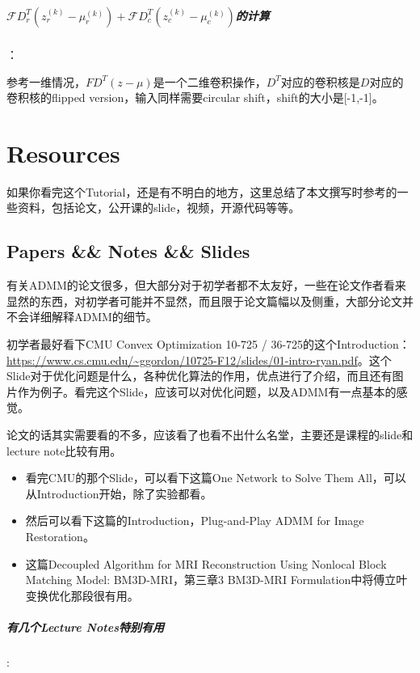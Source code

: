 \documentclass[10pt]{report}
\begin{document}
\paragraph{$\mathcal{F}D_r^T\left( z_r ^{(k)}- \mu_r ^{(k)}\right) + \mathcal{F}D_c^T\left( z_c ^{(k)}- \mu_c ^{(k)}\right)$的计算}：

参考一维情况，$FD^T(z-\mu)$是一个二维卷积操作，$D^T$对应的卷积核是$D$对应的卷积核的flipped version，输入同样需要circular shift，shift的大小是[-1,-1]。

\chapter{Resources}

如果你看完这个Tutorial，还是有不明白的地方，这里总结了本文撰写时参考的一些资料，包括论文，公开课的slide，视频，开源代码等等。

\section{Papers \&\& Notes \&\& Slides}

有关ADMM的论文很多，但大部分对于初学者都不太友好，一些在论文作者看来显然的东西，对初学者可能并不显然，而且限于论文篇幅以及侧重，大部分论文并不会详细解释ADMM的细节。

初学者最好看下CMU Convex Optimization 10-725 / 36-725的这个Introduction：\url{https://www.cs.cmu.edu/~ggordon/10725-F12/slides/01-intro-ryan.pdf}。这个Slide对于优化问题是什么，各种优化算法的作用，优点进行了介绍，而且还有图片作为例子。看完这个Slide，应该可以对优化问题，以及ADMM有一点基本的感觉。

论文的话其实需要看的不多，应该看了也看不出什么名堂，主要还是课程的slide和lecture note比较有用。

\begin{itemize}
	\item 看完CMU的那个Slide，可以看下这篇One Network to Solve Them All\cite{chang2017network}，可以从Introduction开始，除了实验都看。
	\item 然后可以看下这篇的Introduction，Plug-and-Play ADMM for Image Restoration\cite{chan2016plugandplay}。
	\item 这篇Decoupled Algorithm for MRI Reconstruction Using Nonlocal Block Matching Model: BM3D-MRI\cite{Eksioglu2016Decoupled}，第三章3 BM3D-MRI Formulation中将傅立叶变换优化那段很有用。
\end{itemize}

\paragraph{有几个Lecture Notes特别有用}: 
\end{document}
